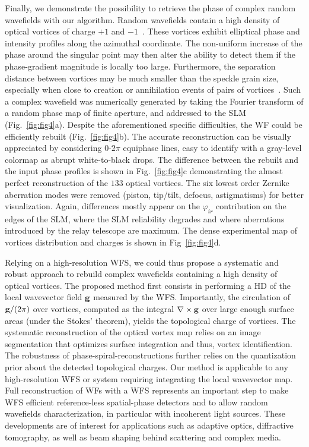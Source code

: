 \documentclass[10pt,twocolumn,twoside,letterpaper]{article}
\begin{document}
Finally, we demonstrate the possibility to retrieve the phase of complex random wavefields with our algorithm. Random wavefields contain a high density of optical vortices of charge $+1$ and $-1$~\cite{Longuet_Higgins_JOSA_60, Berry_PRSLA_74,Freund_1001_correlations}. 
These vortices exhibit elliptical phase and intensity profiles along the azimuthal coordinate. The non-uniform increase of the phase around the singular point may then alter the ability to detect them if the phase-gradient magnitude is locally too large. Furthermore, the separation distance between vortices may be much smaller than the speckle grain size, especially when close to creation or annihilation events of pairs of vortices~\cite{Freund_PRL_94,Nye_PRSLA_88,Pascucci_PRL_16}. 
Such a complex wavefield was numerically generated by taking the Fourier transform of a random phase map of finite aperture, and addressed to the SLM (Fig.~\ref{fig:fig4}a). Despite the aforementioned specific difficulties, the WF could be efficiently rebuilt (Fig.~\ref{fig:fig4}b). The accurate reconstruction can be visually appreciated by considering $0$-$2\pi$ equiphase lines, easy to identify with a gray-level colormap as abrupt white-to-black drops. The difference between the rebuilt and the input phase profiles is shown in Fig.~\ref{fig:fig4}c demonstrating the almost perfect reconstruction of the $133$ optical vortices. The six lowest order Zernike aberration modes were removed (piston, tip/tilt, defocus, astigmatisms) for better visualization.
Again, differences mostly appear on the $\varphi_{ir}$ contribution on the edges of the SLM, where the SLM reliability degrades and where aberrations introduced by the relay telescope are maximum. The dense experimental map of vortices distribution and charges is shown in Fig~\ref{fig:fig4}d.



Relying on a high-resolution WFS, we could thus propose a systematic and robust approach to rebuild complex wavefields containing a high density of optical vortices. The proposed method first consists in performing a HD of the local wavevector field ${\bf g}$ measured by the WFS. Importantly, the circulation of ${\bf g}/(2\pi)$ over vortices, computed as the integral $\nabla \times {\bf g}$ over large enough surface areas (under the Stokes' theorem), yields the topological charge of vortices. The systematic reconstruction of the optical vortex map relies on an image segmentation that optimizes surface integration and thus, vortex identification. The robustness of phase-spiral-reconstructions further relies on the quantization prior about the detected topological charges. Our method is applicable to any high-resolution WFS or system requiring integrating the local wavevector map.
Full reconstruction of WFs with a WFS represents an important step to make WFS efficient reference-less spatial-phase detectors and to allow random wavefields characterization, in particular with incoherent light sources. These developments are of interest for applications such as adaptive optics, diffractive tomography, as well as beam shaping behind scattering and complex media. 
\end{document}
